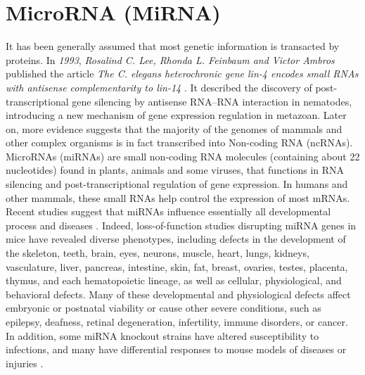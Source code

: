 \section{MicroRNA (MiRNA)}

It has been generally assumed that most genetic information is transacted by proteins. In \textit{1993}, \textit{Rosalind C. Lee, Rhonda L. Feinbaum and Victor Ambros} published the article \textit{The C. elegans heterochronic gene lin-4 encodes small RNAs with antisense complementarity to lin-14} \cite{LEE1993843}. It described the discovery of post-transcriptional gene silencing by antisense RNA–RNA interaction in nematodes, introducing a new mechanism of gene expression regulation in metazoan. Later on, more evidence suggests that the majority of the genomes of mammals and other complex organisms is in fact transcribed into Non-coding RNA (ncRNAs). \\
MicroRNAs (miRNAs) are small non-coding RNA molecules (containing about 22 nucleotides) found in plants, animals and some viruses, that functions in RNA silencing and post-transcriptional regulation of gene expression. In humans and other mammals, these small RNAs help control the expression of most mRNAs. Recent studies suggest that miRNAs influence essentially all developmental process and diseases \cite{mirbase1}. Indeed, loss-of-function studies disrupting miRNA genes in mice have revealed diverse phenotypes, including defects in the development of the skeleton, teeth, brain, eyes, neurons, muscle, heart, lungs, kidneys, vasculature, liver, pancreas, intestine, skin, fat, breast, ovaries, testes, placenta, thymus, and each hematopoietic lineage, as well as cellular, physiological, and behavioral defects. Many of these developmental and physiological defects affect embryonic or postnatal viability or cause other severe conditions, such as epilepsy, deafness, retinal degeneration, infertility, immune disorders, or cancer. In addition, some miRNA knockout strains have altered susceptibility to infections, and many have differential responses to mouse models of diseases
or injuries \cite{Bartel2018}.

